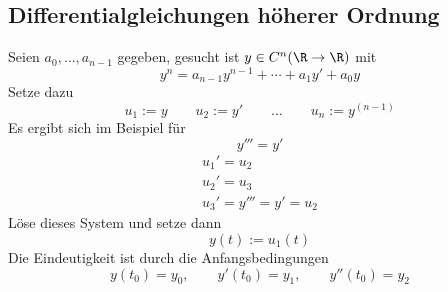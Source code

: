 \documentclass[a4paper,10pt]{scrartcl}
\begin{document}
\subsection{Differentialgleichungen höherer Ordnung} %


Seien $a_0, \dotsc, a_{n-1}$ gegeben, gesucht ist $y \in C^n (\R \to \R)$ mit
\[
	y^{n} = a_{n-1} y^{n-1} + \dotsb + a_1 y' + a_0 y
\]
Setze dazu
\[
	u_1 := y \qquad u_2 := y' \qquad \dotsc \qquad u_n := y^{(n-1)}
\]
Es ergibt sich im Beispiel für 
\[
	y''' = y'
\]
\begin{align*}
	u_1' = u_2 \\
	u_2' = u_3 \\
	u_3' = y''' = y' = u_2
\end{align*}
Löse dieses System und setze dann
\[
	y(t) := u_1(t)
\]
Die Eindeutigkeit ist durch die Anfangsbedingungen
\[
	y(t_0) = y_0, \qquad y'(t_0) = y_1, \qquad y''(t_0) = y_2
\]
\end{document}
